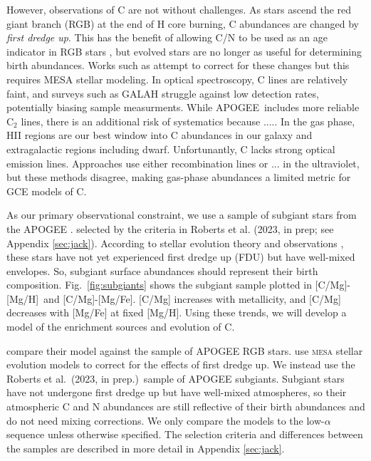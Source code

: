 \documentclass[fleqn,usenatbib]{mnras}
\newcommand{\citetjack}{Roberts et al.~(2023, in prep.)}
\newcommand{\apogee}{APOGEE}
\newcommand{\caah}{[C/Mg]-[Mg/H]}
\newcommand{\caafe}{[C/Mg]-[Mg/Fe]}
\begin{document}


However, observations of C are not without challenges. 
As stars ascend the red giant branch (RGB) at the end of H core burning, C abundances are changed by \textit{first dredge up}\footnotemark{}. This has the benefit of allowing C/N to be used as an age indicator in RGB stars \citep{MG15, martig16, hasselquist19, vincenzo+21}, but evolved stars are no longer as useful for determining birth abundances. Works such as \citet{vincenzo+21} attempt to correct for these changes but this requires MESA stellar modeling. 
In optical spectroscopy, C lines are relatively faint, and surveys such as GALAH struggle against low detection rates, potentially biasing sample measurments. While \apogee\ includes more reliable C$_2$ lines, there is an additional risk of systematics because .....
In the gas phase, HII regions are our best window into C abundances in our galaxy and extragalactic regions including dwarf. 
Unfortunantly, C lacks strong optical emission lines. Approaches use either recombination lines or ... in the ultraviolet, but these methods disagree, making gas-phase abundances a limited metric for GCE models of C.


    As our primary observational constraint, we use a sample of subgiant stars from the \apogee{} \citep{apogee17}. selected by the criteria in Roberts et al. (2023, in prep; see Appendix \ref{sec:jack}).
According to stellar evolution theory and observations \citep{gilroy89, korn+07, lind+08, souto+18, souto19}, these stars have not yet experienced first dredge up (FDU) but have well-mixed envelopes. So, subgiant surface abundances should represent their birth composition. 
Fig.~\ref{fig:subgiants} shows the subgiant sample plotted in \caah\ and \caafe{}. [C/Mg] increases with metallicity, and [C/Mg] decreases with [Mg/Fe] at fixed [Mg/H]. 
Using these trends, we will develop a model of the enrichment sources and evolution of C.

\citet{james+23} compare their model against the \cite{vincenzo+21} sample of \apogee{} \citep{apogee17} RGB stars. \citet{vincenzo+21} use \textsc{mesa} stellar evolution models \citep{mesa} to correct for the effects of first dredge up. 
We instead use the \citetjack~sample of \apogee{} subgiants. Subgiant stars have not undergone first dredge up but have well-mixed atmospheres, so their atmospheric C and N abundances are still reflective of their birth abundances and do not need mixing corrections. We only compare the models to the low-$\alpha$ sequence unless otherwise specified.  The selection criteria and differences between the samples are described in more detail in Appendix \ref{sec:jack}.
\end{document}
